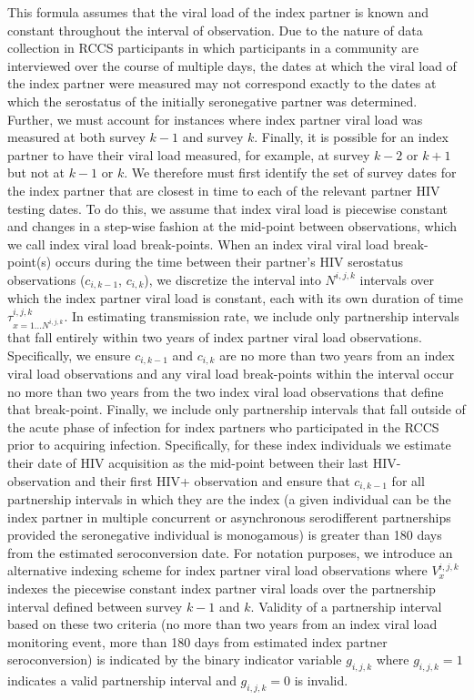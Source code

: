 \documentclass{article}[11pt]
\begin{document}
This formula assumes that the viral load of the index partner is known and constant throughout the interval of observation. Due to the nature of data collection in RCCS participants in which participants in a community are interviewed over the course of multiple days, the dates at which the viral load of the index partner were measured may not correspond exactly to the dates at which the serostatus of the initially seronegative partner was determined. Further, we must account for instances where index partner viral load was measured at both survey $k-1$ and survey $k$. Finally, it is possible for an index partner to have their viral load measured, for example, at survey $k-2$ or $k+1$ but not at $k-1$ or $k$. We therefore must first identify the set of survey dates for the index partner that are closest in time to each of the relevant partner HIV testing dates. To do this, we assume that index viral load is piecewise constant and changes in a step-wise fashion at the mid-point between observations, which we call index viral load break-points. When an index viral viral load break-point(s) occurs during the time between their partner's HIV serostatus observations ($c_{i,{k-1}}$, $c_{i,k}$), we discretize the interval into $N^{i,j,k}$ intervals over which the index partner viral load is constant, each with its own duration of time $\tau_{x=1...N^{i,j,k}}^{i,j,k}$. In estimating transmission rate, we include only partnership intervals that fall entirely within two years of index partner viral load observations. Specifically, we ensure $c_{i,k-1}$ and $c_{i,k}$ are no more than two years from an index viral load observations and any viral load break-points within the interval occur no more than two years from the two index viral load observations that define that break-point. Finally, we include only partnership intervals that fall outside of the acute phase of infection for index partners who participated in the RCCS prior to acquiring infection. Specifically, for these index individuals we estimate their date of HIV acquisition as the mid-point between their last HIV- observation and their first HIV+ observation and ensure that $c_{i,{k-1}}$ for all partnership intervals in which they are the index (a given individual can be the index partner in multiple concurrent or asynchronous serodifferent partnerships provided the seronegative individual is monogamous) is greater than 180 days from the estimated seroconversion date. For notation purposes, we introduce an alternative indexing scheme for index partner viral load observations where $V^{i,j,k}_{x}$ indexes the piecewise constant index partner viral loads over the partnership interval defined between survey $k-1$ and $k.$ Validity of a partnership interval based on these two criteria (no more than two years from an index viral load monitoring event, more than 180 days from estimated index partner seroconversion) is indicated by the binary indicator variable $g_{i,j,k}$ where $g_{i,j,k}=1$ indicates a valid partnership interval and $g_{i,j,k}=0$ is invalid. 
\end{document}
